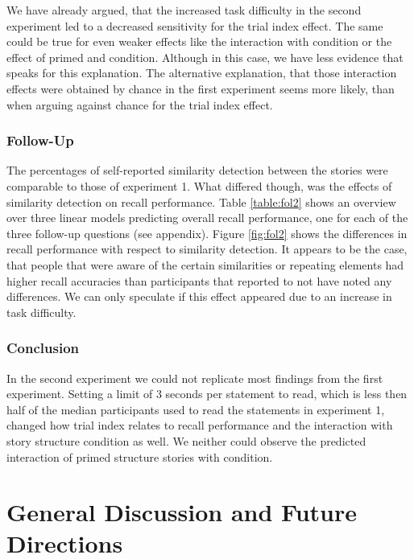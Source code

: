 \documentclass[a4paper,man,natbib,floatsintext,import]{apa6}
\begin{document}
We have already argued, that the increased task difficulty in the second experiment led to a decreased sensitivity for the trial index effect. The same could be true for even weaker effects like the interaction with condition or the effect of primed and condition. Although in this case, we have less evidence that speaks for this explanation. The alternative explanation, that those interaction effects were obtained by chance in the first experiment seems more likely, than when arguing against chance for the trial index effect.



\subsubsection{Follow-Up}
The percentages of self-reported similarity detection between the stories were comparable to those of experiment 1. What differed though, was the effects of similarity detection on recall performance. Table \ref{table:fol2} shows an overview over three linear models predicting overall recall performance, one for each of the three follow-up questions (see appendix). Figure \ref{fig:fol2} shows the differences in recall performance with respect to similarity detection. It appears to be the case, that people that were aware of the certain similarities or repeating elements had higher recall accuracies than participants that reported to not have noted any differences. We can only speculate if this effect appeared due to an increase in task difficulty.

\subsubsection{Conclusion}
In the second experiment we could not replicate most findings from the first experiment. Setting a limit of 3 seconds per statement to read, which is less then half of the median participants used to read the statements in experiment 1, changed how trial index relates to recall performance and the interaction with story structure condition as well. We neither could observe the predicted interaction of primed structure stories with condition.

\newpage
\section{General Discussion and Future Directions}
\end{document}
